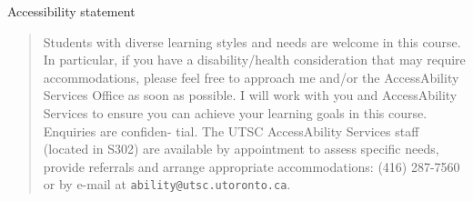 \documentclass[ignorenonframetext,]{beamer}
\begin{document}
\begin{frame}[fragile]{Accessibility statement}
\protect\hypertarget{accessibility-statement}{}

\begin{quote}
Students with diverse learning styles and needs are welcome in this
course. In particular, if you have a disability/health consideration
that may require accommodations, please feel free to approach me and/or
the AccessAbility Services Office as soon as possible. I will work with
you and AccessAbility Services to ensure you can achieve your learning
goals in this course. Enquiries are confiden- tial. The UTSC
AccessAbility Services staff (located in S302) are available by
appointment to assess specific needs, provide referrals and arrange
appropriate accommodations: (416) 287-7560 or by e-mail at
\texttt{ability@utsc.utoronto.ca}.
\end{quote}

\end{frame}
\end{document}

